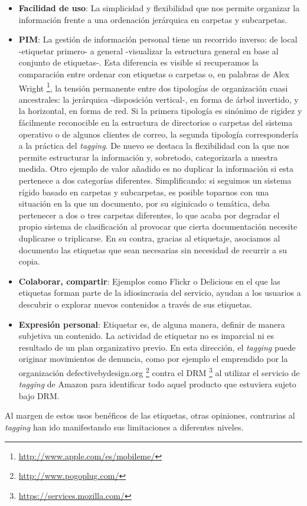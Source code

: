 \documentclass[12pt, a4paper,twoside]{book}
\begin{document}
\begin{itemize}
\item
  \textbf{Facilidad de uso}: La simplicidad y flexibilidad que nos
  permite organizar la información frente a una ordenación jerárquica
  en carpetas y subcarpetas.
\item
  \textbf{PIM}: La gestión de información personal tiene un recorrido
  inverso: de local -etiquetar primero- a general -visualizar la
  estructura general en base al conjunto de etiquetas-. Esta
  diferencia es visible si recuperamos la comparación entre ordenar
  con etiquetas o carpetas o, en palabras de Alex Wright%
  \footnote{\href{http://www.apple.com/es/mobileme/}{http://www.apple.com/es/mobileme/}},
  la tensión permanente entre dos tipologías de organización cuasi
  ancestrales: la jerárquica -disposición vertical-, en forma de
  árbol invertido, y la horizontal, en forma de red. Si la primera
  tipología es sinónimo de rigidez y fácilmente reconocible en la
  estructura de directorios o carpetas del sistema operativo o de
  algunos clientes de correo, la segunda tipología correspondería a
  la práctica del \emph{tagging}. De nuevo se destaca la flexibilidad
  con la que nos permite estructurar la información y, sobretodo,
  categorizarla a nuestra medida. Otro ejemplo de valor añadido es no
  duplicar la información si esta pertenece a dos categorías
  diferentes. Simplificando: si seguimos un sistema rígido basado en
  carpetas y subcarpetas, es posible toparnos con una situación en la
  que un documento, por su siginicado o temática, deba pertenecer a
  dos o tres carpetas diferentes, lo que acaba por degradar el propio
  sistema de clasificación al provocar que cierta documentación
  necesite duplicarse o triplicarse. En su contra, gracias al
  etiquetaje, asociamos al documento las etiquetas que sean
  necesarias sin necesidad de recurrir a su copia.
\item
  \textbf{Colaborar, compartir}: Ejemplos como Flickr o Delicious en
  el que las etiquetas forman parte de la idiosincrasia del servicio,
  ayudan a los usuarios a descubrir o explorar nuevos contenidos a
  través de sus etiquetas.
\item
  \textbf{Expresión personal}: Etiquetar es, de alguna manera,
  definir de manera subjetiva un contenido. La actividad de etiquetar
  no es imparcial ni es resultado de un plan organizativo previo. En
  esta dirección, el \emph{tagging} puede originar movimientos de
  denuncia, como por ejemplo el emprendido por la organización
  defectivebydesign.org%
  \footnote{\href{http://www.pogoplug.com/}{http://www.pogoplug.com/}}
  contra el DRM%
  \footnote{\href{https://services.mozilla.com/}{https://services.mozilla.com/}}
  al utilizar el servicio de \emph{tagging} de Amazon para
  identificar todo aquel producto que estuviera sujeto bajo DRM.
\end{itemize}
Al margen de estos usos benéficos de las etiquetas, otras
opiniones, contrarias al \emph{tagging} han ido manifestando sus
limitaciones a diferentes niveles.
\end{document}
